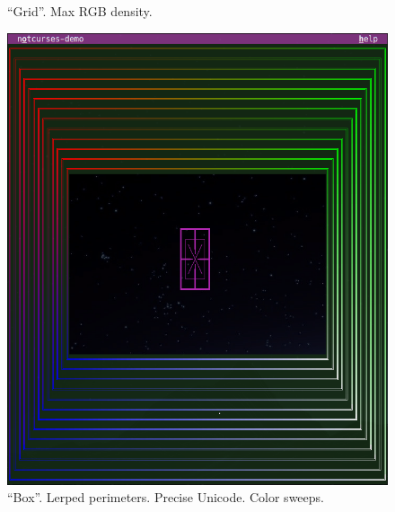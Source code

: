 \documentclass[letterpaper,10pt]{article}
\begin{document}
\begin{figure}
\begin{minipage}{0.45\textwidth}
    \caption{``Grid''. Max RGB density.}
  \end{minipage}\hfill
\end{figure}

\begin{figure}
  \centering
  \begin{minipage}{0.45\textwidth}
    \includegraphics[width=1\linewidth]{media/demo-box.png}
    \caption{``Box''. Lerped perimeters. Precise Unicode. Color sweeps.}
  \end{minipage}\hfill
  \begin{minipage}{0.45\textwidth}

\end{minipage}
\end{figure}
\end{document}

